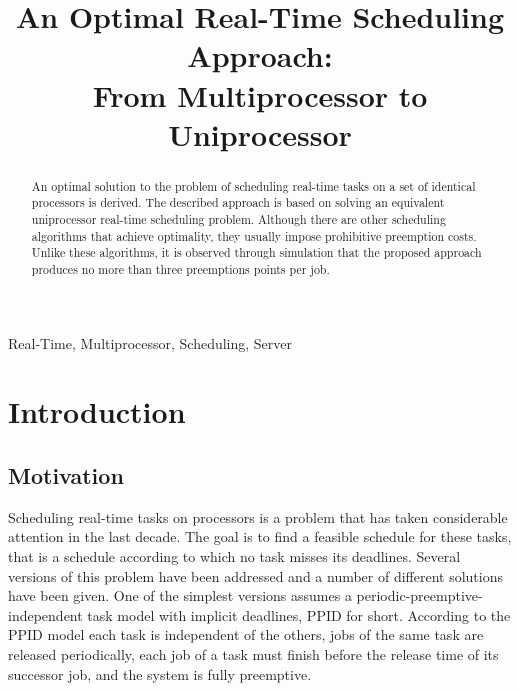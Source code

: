\documentclass[twocolumn, compsocconf]{IEEEtran}
\newcounter{proc}
\begin{document}
\title{
An Optimal Real-Time Scheduling Approach:\\From Multiprocessor to Uniprocessor
}





\author{
}


\maketitle

\begin{abstract}
  An optimal solution to the problem of scheduling real-time tasks on a set of
  identical processors is derived. The described approach is based on solving an
  equivalent uniprocessor real-time scheduling problem. Although there are other
  scheduling algorithms that achieve optimality, they usually impose prohibitive
  preemption costs. Unlike these algorithms, it is observed through simulation
  that the proposed approach produces no more than three preemptions points per
  job.
\end{abstract}

\begin{IEEEkeywords}
  Real-Time, Multiprocessor, Scheduling, Server
\end{IEEEkeywords}


\IEEEpeerreviewmaketitle

\section{Introduction}\label{sec:introduction}

\subsection{Motivation}\label{sec:motiv}

Scheduling  real-time tasks on  processors is a problem that has taken
considerable attention in the last decade. The goal is to find a feasible
schedule for these tasks, that is a schedule according to which no task misses
its deadlines. Several versions of this problem have been addressed and a number
of different solutions have been given. One of the simplest versions assumes a
periodic-preemptive-independent task model with implicit deadlines, PPID for
short. According to the PPID model each task is independent of the others, jobs
of the same task are released periodically, each job of a task must finish
before the release time of its successor job, and the system is fully
preemptive.
 
\end{document}
